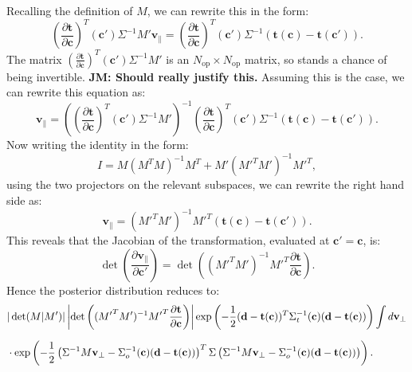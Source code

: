 \documentclass[withindex,glossary]{cam-thesis}
\renewcommand{\vec}[1]{\textbf{#1}} %
\newcommand{\JM}[1]{{\bf\color{cyan}JM: #1}}
\begin{document}
Recalling the definition of $M$, we can rewrite this in the form:
\begin{equation}
\left( \frac{\partial \vec{t}}{\partial \vec{c}} \right)^T (\vec{c}') \Sigma^{-1} M' \vec{v}_{\parallel} = \left( \frac{\partial \vec{t}}{\partial \vec{c}} \right)^T (\vec{c}') \Sigma^{-1} \left( \vec{t}(\vec{c}) - \vec{t}(\vec{c}') \right).
\end{equation}
The matrix $\left( \frac{\partial \vec{t}}{\partial \vec{c}} \right)^T (\vec{c}') \Sigma^{-1} M'$ is an $N_{\text{op}} \times N_{\text{op}}$ matrix, so stands a chance of being invertible. \JM{Should really justify this.} Assuming this is the case, we can rewrite this equation as:
\begin{equation}
\vec{v}_{\parallel} = \left( \left( \frac{\partial \vec{t}}{\partial \vec{c}} \right)^T (\vec{c}') \Sigma^{-1} M' \right)^{-1} \left( \frac{\partial \vec{t}}{\partial \vec{c}} \right)^T (\vec{c}') \Sigma^{-1} \left( \vec{t}(\vec{c}) - \vec{t}(\vec{c}') \right).
\end{equation}
Now writing the identity in the form:
\begin{equation}
I = M(M^TM)^{-1} M^T + M'({M'}^T M')^{-1} {M'}^T,
\end{equation}
using the two projectors on the relevant subspaces, we can rewrite the right hand side as:
\begin{equation}
\vec{v}_{\parallel} = ({M'}^T M')^{-1} {M'}^T(\vec{t}(\vec{c}) - \vec{t}(\vec{c}')).
\end{equation}
This reveals that the Jacobian of the transformation, evaluated at $\vec{c}' = \vec{c}$, is:
\begin{equation}
\det\left( \frac{\partial \vec{v}_{\parallel}}{\partial \vec{c}'}\right) = \det\left( ({M'}^T M')^{-1} {M'}^T \frac{\partial \vec{t}}{\partial \vec{c}} \right).
\end{equation}
Hence the posterior distribution reduces to:
\begin{align}
& |\det(M|M')| \left| \det\left( ({M'}^T M')^{-1} {M'}^T \frac{\partial \vec{t}}{\partial \vec{c}} \right) \right| \exp\left( -\frac{1}{2}(\vec{d} - \vec{t}(\vec{c}))^T\Sigma_t^{-1}(\vec{c}) (\vec{d} - \vec{t}(\vec{c})) \right) \int d\vec{v}_{\perp} \notag\\[1.5ex]
& \cdot \exp\left( -\frac{1}{2} \left(\Sigma^{-1} M \vec{v}_{\perp} - \Sigma_o^{-1}(\vec{c}) (\vec{d} - \vec{t}(\vec{c}))\right)^T \Sigma \left(\Sigma^{-1} M \vec{v}_{\perp} - \Sigma_o^{-1}(\vec{c}) (\vec{d} - \vec{t}(\vec{c}))\right) \right).
\end{align}
\end{document}

